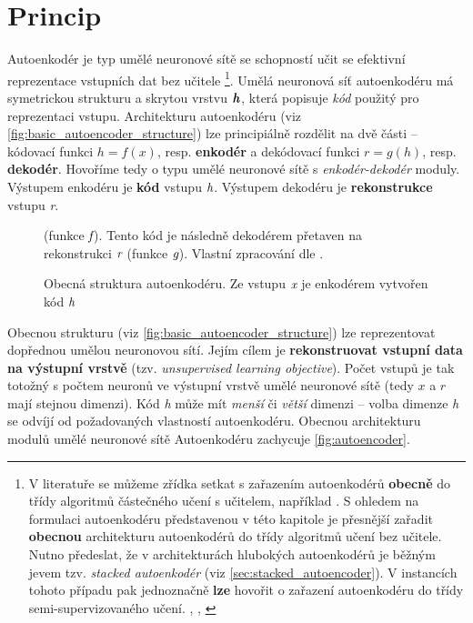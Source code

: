 \section{Princip}
\label{sec:ae_princip}
Autoenkodér je typ umělé neuronové sítě se schopností učit se efektivní reprezentace vstupních dat bez učitele
\footnote{V literatuře se můžeme zřídka setkat s zařazením autoenkodérů \textbf{obecně} do třídy algoritmů částečného učení s učitelem, například \cite[str. 95]{Chollet2017}. S ohledem na formulaci autoenkodéru představenou v této kapitole je přesnější zařadit \textbf{obecnou} architekturu autoenkodérů do třídy algoritmů učení bez učitele. Nutno předeslat, že v architekturách hlubokých autoenkodérů je běžným jevem tzv. \emph{stacked autoenkodér} (viz \autoref{sec:stacked_autoencoder}). V instancích tohoto případu pak jednoznačně \textbf{lze} hovořit o zařazení autoenkodéru do třídy semi-supervizovaného učení. \cite{Bengio2006}, \cite{Ranzato2007}, \cite{Erhan2010}}.
Umělá neuronová síť autoenkodéru má symetrickou strukturu a skrytou vrstvu $\textbf{\emph{h}}$, která popisuje \emph{kód} použitý pro reprezentaci vstupu.
Architekturu autoenkodéru (viz \autoref{fig:basic_autoencoder_structure}) lze principiálně rozdělit na dvě části – kódovací funkci $h = f(x)$, resp. \textbf{enkodér}
a dekódovací funkci $r = g(h)$, resp. \textbf{dekodér}.
Hovoříme tedy o typu umělé neuronové sítě s \emph{enkodér-dekodér} moduly.
Výstupem enkodéru je \textbf{kód} vstupu $\emph{h}$. Výstupem dekodéru je \textbf{rekonstrukce} vstupu \emph{r}. \cite{Goodfellow2016}

\begin{figure}[h]
    \centering
    \caption{Obecná struktura autoenkodéru. Ze vstupu $\emph{x}$ je enkodérem vytvořen kód $\emph{h}$} (funkce $\emph{f}$). Tento kód je následně dekodérem přetaven na rekonstrukci $\emph{r}$ (funkce $\emph{g}$). Vlastní zpracování dle \textcite{Goodfellow2016}.
    \label{fig:basic_autoencoder_structure}
\end{figure}

Obecnou strukturu (viz \autoref{fig:basic_autoencoder_structure}) lze reprezentovat dopřednou umělou neuronovou sítí.
Jejím cílem je \textbf{rekonstruovat vstupní data na výstupní vrstvě} (tzv. \emph{unsupervised learning objective}). Počet vstupů je tak totožný s počtem neuronů ve výstupní vrstvě umělé neuronové sítě (tedy $x$ a $r$ mají stejnou dimenzi).
Kód \emph{h} může mít \emph{menší} či \emph{větší} dimenzi – volba dimenze \emph{h} se odvíjí od požadovaných vlastností autoenkodéru.
Obecnou architekturu modulů umělé neuronové sítě Autoenkodéru zachycuje \autoref{fig:autoencoder}. \cite{Charte2018}


